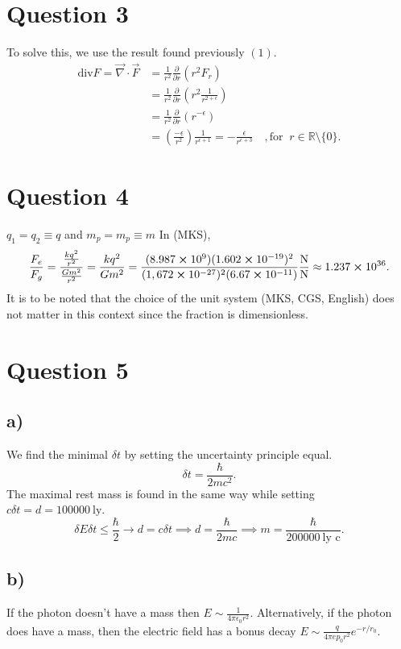 \documentclass[
	12pt,
	]{article}
\newcommand{\ep}{\epsilon}
\theoremstyle{definition}
\theoremstyle{definition}
\theoremstyle{definition}
\theoremstyle{definition}
\theoremstyle{definition}
\theoremstyle{example}
\theoremstyle{note}
\theoremstyle{remark}
\theoremstyle{example}
\begin{document}
			\section*{Question 3 }
				To solve this, we use the result found previously $(1)$. 
				\begin{align*}
					\text{div}F = \vec{\nabla} \cdot \vec{F} &= \frac{1}{r^{2}} \frac{\partial}{\partial r} (r^{2} F_{r}) \\
					&= \frac{1}{r^{2}} \frac{\partial}{\partial r} \left(r^{2}\frac{1}{r^{2+\ep}}\right)\\ 
					&= \frac{1}{r^{2}} \frac{\partial}{\partial r} (r^{-\ep}) \\
					&= \left(\frac{-\ep }{r^{2}}\right) \frac{1}{r^{\ep +1}} = -\frac{\ep}{r^{\ep + 3}} \quad, \text{for } \ r\in \mathbb{R} \setminus \{0\}.
				\end{align*} 	   	
			\section*{Question 4}
				$q_{1} = q_{2}\equiv q$ and $m_{p} = m_{p} \equiv m$ In (MKS),
				\begin{gather*}
					\frac{F_{e}}{F_{g}} = \frac{\frac{kq^{2}}{r^{2}}}{\frac{Gm^{2}}{r^{2}}} = \frac{kq^{2}}{Gm^{2}}
					= \frac{(8.987 \cross 10^{9})(1.602 \cross 10^{-19})^{2}}{(1,672\cross 10^{-27})^{2}(6.67\cross 10^{-11})} \frac{\si{\newton}}{\si{\newton}} \approx  1.237 \cross 10^{36}.
				\end{gather*} 
			It is to be noted that the choice of the unit system (MKS, CGS, English) does not matter in this context since the fraction is dimensionless. 
			
			\section*{Question 5}
				\subsection*{a) }
					We find the minimal $\delta t$ by setting the uncertainty principle equal. 
					$$ \delta t = \frac{\hbar}{2 m c^{2}}.$$
					The maximal rest mass is found in the same way while setting $c\delta t = d = 100 000 \ \text{ly}$.
					$$ \delta E \delta t \le \frac{\hbar}{2} \xrightarrow{} d= c\delta t \implies d = \frac{\hbar }{2mc} \implies m = \frac{\hbar }{200 000 \ \text{ly c}}.$$	
				\subsection*{b) }
					If the photon doesn't have a mass then $E \sim \frac{1}{4\pi \ep_{0}r^{2}}$. Alternatively, if the photon does have a mass, then the electric field has a bonus decay $E \sim \frac{q}{4\pi ep_{0}r^{2}}e^{-r/r_{0}}$.
					
\end{document}
